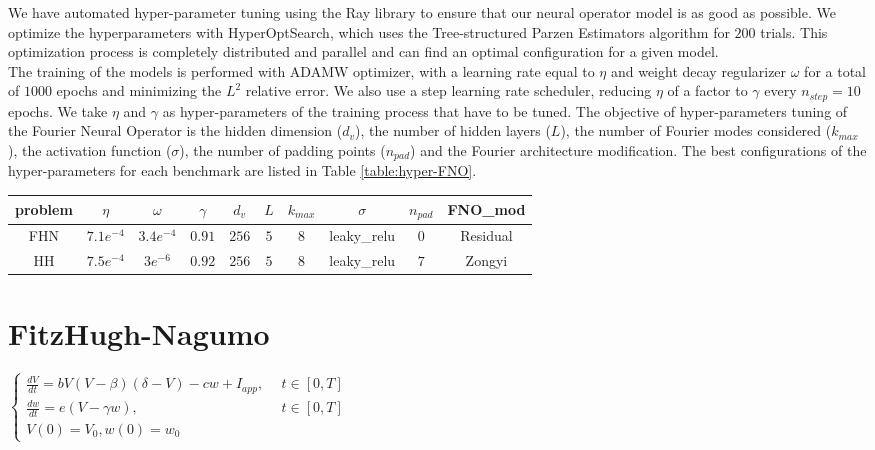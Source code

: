 \documentclass{article}
\newcommand{\learningRate}{\eta}
\newcommand{\schedulerStep}{n_{step}}
\newcommand{\schedulerGamma}{\gamma}
\newcommand{\weightDecay}{\omega}
\newcommand{\width}{d_v}
\newcommand{\hiddenLayer}{L}
\newcommand{\fourierModes}{k_{max}}
\newcommand{\activation}{\sigma}
\newcommand{\paddingPoints}{n_{pad}}
\begin{document}
We have automated hyper-parameter tuning using the Ray library to ensure that our neural operator model is as good as possible. We optimize the hyperparameters with HyperOptSearch, which uses the Tree-structured Parzen Estimators algorithm for $200$ trials. This optimization process is completely distributed and parallel and can find an optimal configuration for a given model.
\\
The training of the models is performed with ADAMW optimizer, with a learning rate equal to $\learningRate$ and weight decay regularizer $\weightDecay$ for a total of $1000$ epochs and minimizing the $L^2$ relative error. We also use a step learning rate scheduler, reducing $\learningRate$ of a factor to $\schedulerGamma$ every $\schedulerStep=10$ epochs. We take $\learningRate$ and $\schedulerGamma$ as hyper-parameters of the training process that have to be tuned.
\noindent
The objective of hyper-parameters tuning of the Fourier Neural Operator is the hidden dimension ($\width$), the number of hidden layers ($\hiddenLayer$), the number of Fourier modes considered ($\fourierModes$), the activation function ($\activation$), the number of padding points ($\paddingPoints$) and the Fourier architecture modification. The best configurations of the hyper-parameters for each benchmark are listed in Table \ref{table:hyper-FNO}.
\begin{center}
    \begin{tabular}{cccccccccc}
        \hline
        problem & $\learningRate$ & $\weightDecay$ & $\schedulerGamma$ & $\width$ & $\hiddenLayer$ & $\fourierModes$ & $\activation$ & $\paddingPoints$ & FNO\_mod \\
        \hline\hline
        FHN     & $7.1e^{-4}$     & $3.4e^{-4}$    & $0.91$            & $256$    & $5$            & $8$             & leaky\_relu   & $0$              & Residual \\
        HH      & $7.5e^{-4}$     & $3e^{-6}$      & $0.92$            & $256$    & $5$            & $8$             & leaky\_relu   & $7$              & Zongyi   \\
        \hline
    \end{tabular}
    \label{table:hyper-FNO}
\end{center}

\newpage
\section{FitzHugh-Nagumo}
\begin{center}
    $\begin{cases}
            \frac{dV}{dt} = bV(V-\beta)(\delta-V) -cw +I_{app}, \ \  & t\in[0,T]  \\[15pt]

            \frac{dw}{dt} = e(V-\gamma w), \ \                       & t\in [0,T] \\[15pt]

            V(0) =V_0, w(0)=w_0
        \end{cases}$
\end{center}
\end{document}
